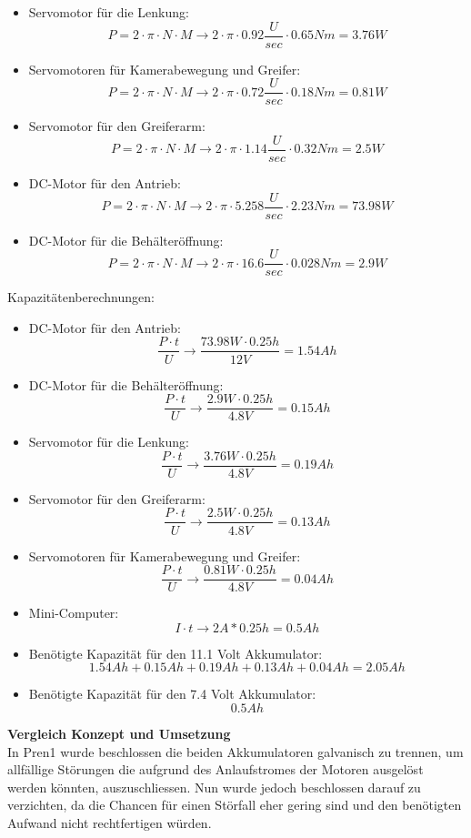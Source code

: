 \begin{itemize}
\item Servomotor für die Lenkung:
\[
P=2\cdot \pi\cdot N\cdot M \to 2\cdot \pi\cdot 0.92\frac{U}{sec}\cdot 0.65Nm = 3.76W
\]
\item Servomotoren für Kamerabewegung und Greifer:
\[
P=2\cdot \pi\cdot N\cdot M \to 2\cdot \pi\cdot 0.72\frac{U}{sec}\cdot 0.18Nm = 0.81W
\]
\item Servomotor für den Greiferarm:
\[
P=2\cdot \pi\cdot N\cdot M \to 2\cdot \pi\cdot 1.14\frac{U}{sec}\cdot 0.32Nm = 2.5W
\]
\item DC-Motor für den Antrieb:
\[
P=2\cdot \pi\cdot N\cdot M \to 2\cdot \pi\cdot 5.258\frac{U}{sec}\cdot 2.23Nm = 73.98W
\]
\item DC-Motor für die Behälteröffnung:
\[
P=2\cdot \pi\cdot N\cdot M \to 2\cdot \pi\cdot 16.6\frac{U}{sec}\cdot 0.028Nm = 2.9W
\]
\end{itemize}
Kapazitätenberechnungen:
\begin{itemize}
\item DC-Motor für den Antrieb:
\[
\frac{P\cdot t}{U} \to \frac{73.98W\cdot0.25h}{12V}= 1.54 Ah
\]
\item DC-Motor für die Behälteröffnung:
\[
\frac{P\cdot t}{U} \to \frac{2.9W\cdot0.25h}{4.8V}= 0.15 Ah
\]
\item Servomotor für die Lenkung:
\[
\frac{P\cdot t}{U} \to \frac{3.76W\cdot0.25h}{4.8V}= 0.19 Ah
\]
\item Servomotor für den Greiferarm:
\[
\frac{P\cdot t}{U} \to \frac{2.5W\cdot0.25h}{4.8V}= 0.13 Ah
\]
\item Servomotoren für Kamerabewegung und Greifer:
\[
\frac{P\cdot t}{U} \to \frac{0.81W\cdot0.25h}{4.8V}= 0.04 Ah
\]
\item Mini-Computer:
\[
I\cdot t \to 2A*0.25h = 0.5 Ah
\]
\item Benötigte Kapazität für den 11.1 Volt Akkumulator:
\[
1.54Ah+0.15Ah+0.19Ah+0.13Ah+0.04Ah = 2.05Ah
\]
\item Benötigte Kapazität für den 7.4 Volt Akkumulator:
\[
0.5Ah
\]
\end{itemize}
\textbf{Vergleich Konzept und Umsetzung}\\[0.2cm]
In Pren1 wurde beschlossen die beiden Akkumulatoren galvanisch zu trennen, um allfällige Störungen die aufgrund des Anlaufstromes der Motoren ausgelöst werden könnten, auszuschliessen. Nun wurde jedoch beschlossen darauf zu verzichten, da die Chancen für einen Störfall eher gering sind und den benötigten Aufwand nicht rechtfertigen würden.
